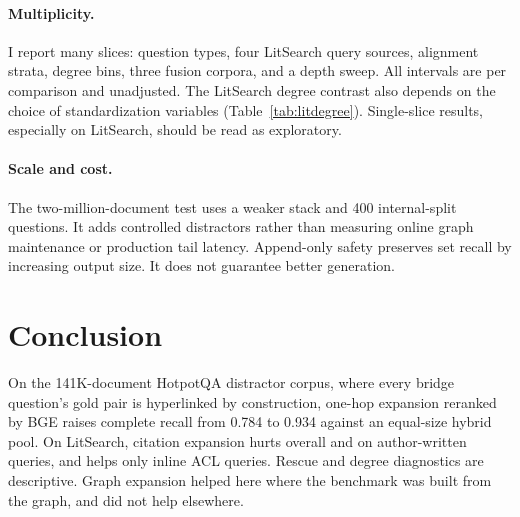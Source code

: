 \documentclass[10pt,twocolumn]{article}
\begin{document}
\paragraph{Multiplicity.}
I report many slices: question types, four LitSearch query sources,
alignment strata, degree bins, three fusion corpora, and a depth sweep. All
intervals are per comparison and unadjusted. The LitSearch degree contrast also
depends on the choice of standardization variables (Table~\ref{tab:litdegree}). Single-slice results,
especially on LitSearch, should be read as exploratory.

\paragraph{Scale and cost.}
The two-million-document test uses a weaker stack and 400 internal-split
questions. It adds controlled distractors rather than measuring online graph
maintenance or production tail latency. Append-only safety preserves set recall
by increasing output size. It does not guarantee better generation.

\section{Conclusion}

On the 141K-document HotpotQA distractor corpus, where every bridge question's
gold pair is hyperlinked by construction, one-hop expansion reranked by BGE
raises complete recall from 0.784 to 0.934 against an equal-size hybrid pool.
On LitSearch, citation expansion hurts overall and on author-written queries,
and helps only inline ACL queries. Rescue and degree diagnostics are
descriptive. Graph expansion helped here where the benchmark was built from the
graph, and did not help elsewhere.


\footnotesize
\setlength{\bibsep}{1.5pt plus 0.3ex}

\end{document}
